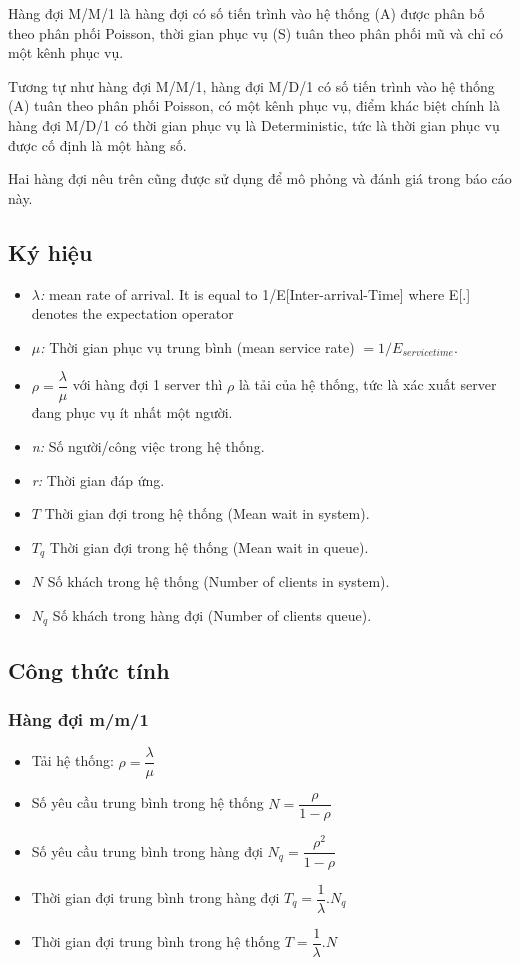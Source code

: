\documentclass[a4paper]{article}
\begin{document}
\par 
Hàng đợi M/M/1 là hàng đợi có số tiến trình vào hệ thống (A) được phân bố theo phân phối Poisson, thời gian phục vụ (S) tuân theo phân phối mũ và chỉ có một kênh phục vụ. 
\par
Tương tự như hàng đợi M/M/1, hàng đợi M/D/1 có số tiến trình vào hệ thống (A) tuân theo phân phối Poisson, có một kênh phục vụ, điểm khác biệt chính là hàng đợi M/D/1 có thời gian phục vụ là Deterministic, tức là thời gian phục vụ được cố định là một hàng số.
\par
Hai hàng đợi nêu trên cũng được sử dụng để mô phỏng và đánh giá trong báo cáo này.
\subsection{Ký hiệu}
\begin{itemize}
\item[]  \textit{$\lambda$:} mean rate of arrival. It is equal to 1/E[Inter-arrival-Time] where E[.] denotes the expectation operator
\item[] \textit{$\mu$:} Thời gian phục vụ trung bình (mean service rate) $=1/E_{service time}$. 
\item[] \textit{$\rho = \dfrac{\lambda}{\mu}$} với hàng đợi 1 server thì $\rho$ là tải của hệ thống, tức là xác xuất server đang phục vụ ít nhất một người.  
\item[] \textit{n:} Số người/công việc trong hệ thống. 
\item[] \textit{r:} Thời gian đáp ứng.
\item[] \textit{$T$} Thời gian đợi trong hệ thống (Mean wait in system).
\item[] \textit{$T_q$} Thời gian đợi trong hệ thống (Mean wait in queue).
\item[] \textit{$N$} Số khách trong hệ thống (Number of clients in system).
\item[] \textit{$N_q$} Số khách trong hàng đợi (Number of clients queue).
\end{itemize}
\subsection{Công thức tính}
\subsubsection{Hàng đợi m/m/1}
\begin{itemize}
\item Tải hệ thống: $\rho = \dfrac{\lambda}{\mu}$
\item Số yêu cầu trung bình trong hệ thống $N=\dfrac{\rho}{1-\rho}$
\item Số yêu cầu trung bình trong hàng đợi $N_q=\dfrac{\rho^2}{1-\rho}$
\item Thời gian đợi trung bình trong hàng đợi $T_q=\dfrac{1}{\lambda}.N_q$
\item Thời gian đợi trung bình trong hệ thống $T=\dfrac{1}{\lambda}.N$
\end{itemize}
\end{document}
